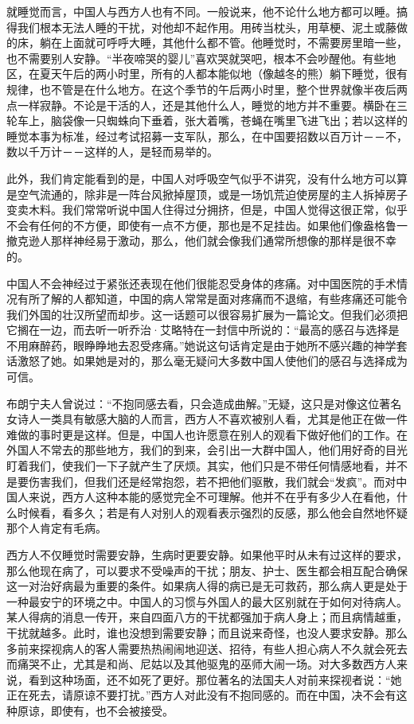 \documentclass[12pt,oneside]{book}
\begin{document}
\begin{common-format}
就睡觉而言，中国人与西方人也有不同。一般说来，他不论什么地方都可以睡。搞得我们根本无法人睡的干扰，对他却不起作用。用砖当枕头，用草梗、泥土或藤做的床，躺在上面就可呼呼大睡，其他什么都不管。他睡觉时，不需要房里暗一些，也不需要别人安静。“半夜啼哭的婴儿”喜欢哭就哭吧，根本不会吵醒他。有些地区，在夏天午后的两小时里，所有的人都本能似地（像越冬的熊）躺下睡觉，很有规律，也不管是在什么地方。在这个季节的午后两小时里，整个世界就像半夜后两点一样寂静。不论是干活的人，还是其他什么人，睡觉的地方并不重要。横卧在三轮车上，脑袋像一只蜘蛛向下垂着，张大着嘴，苍蝇在嘴里飞进飞出；若以这样的睡觉本事为标准，经过考试招募一支军队，那么，在中国要招数以百万计－－不，数以千万计－－这样的人，是轻而易举的。 

此外，我们肯定能看到的是，中国人对呼吸空气似乎不讲究，没有什么地方可以算是空气流通的，除非是一阵台风掀掉屋顶，或是一场饥荒迫使房屋的主人拆掉房子变卖木料。我们常常听说中国人住得过分拥挤，但是，中国人觉得这很正常，似乎不会有任何的不方便，即使有一点不方便，那也是不足挂齿。如果他们像盎格鲁一撤克逊人那样神经易于激动，那么，他们就会像我们通常所想像的那样是很不幸的。 

中国人不会神经过于紧张还表现在他们很能忍受身体的疼痛。对中国医院的手术情况有所了解的人都知道，中国的病人常常是面对疼痛而不退缩，有些疼痛还可能令我们外国的壮汉所望而却步。这一话题可以很容易扩展为一篇论文。但我们必须把它搁在一边，而去听一听乔治·艾略特在一封信中所说的：“最高的感召与选择是不用麻醉药，眼睁睁地去忍受疼痛。”她说这句话肯定是由于她所不感兴趣的神学套话激怒了她。如果她是对的，那么毫无疑问大多数中国人使他们的感召与选择成为可信。 

布朗宁夫人曾说过：“不抱同感去看，只会造成曲解。”无疑，这只是对像这位著名女诗人一类具有敏感大脑的人而言，西方人不喜欢被别人看，尤其是他正在做一件难做的事时更是这样。但是，中国人也许愿意在别人的观看下做好他们的工作。在外国人不常去的那些地方，我们的到来，会引出一大群中国人，他们用好奇的目光盯着我们，使我们一下子就产生了厌烦。其实，他们只是不带任何情感地看，并不是要伤害我们，但我们还是经常抱怨，若不把他们驱散，我们就会“发疯”。而对中国人来说，西方人这种本能的感觉完全不可理解。他并不在乎有多少人在看他，什么时候看，看多久；若是有人对别人的观看表示强烈的反感，那么他会自然地怀疑那个人肯定有毛病。 

西方人不仅睡觉时需要安静，生病时更要安静。如果他平时从未有过这样的要求，那么他现在病了，可以要求不受噪声的干扰；朋友、护士、医生都会相互配合确保这一对治好病最为重要的条件。如果病人得的病已是无可救药，那么病人更是处于一种最安宁的环境之中。中国人的习惯与外国人的最大区别就在于如何对待病人。某人得病的消息一传开，来自四面八方的干扰都强加于病人身上；而且病情越重，干扰就越多。此时，谁也没想到需要安静；而且说来奇怪，也没人要求安静。那么多前来探视病人的客人需要热热闹闹地迎送、招待，有些人担心病人不久就会死去而痛哭不止，尤其是和尚、尼姑以及其他驱鬼的巫师大闹一场。对大多数西方人来说，看到这种场面，还不如死了更好。那位著名的法国夫人对前来探视者说：“她正在死去，请原谅不要打扰。”西方人对此没有不抱同感的。而在中国，决不会有这种原谅，即使有，也不会被接受。 


\end{common-format}
\end{document}
